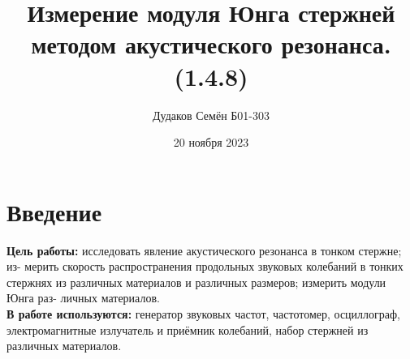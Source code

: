 \documentclass[a4, 12pt]{article}
\title{\textbf{Измерение модуля Юнга стержней методом акустического резонанса. (1.4.8)}}
\author{Дудаков Семён Б01-303}
\date{20 ноября 2023}
\begin{document}
	\maketitle

	\section{Введение}
    \textbf{Цель работы:} исследовать явление акустического резонанса в тонком стержне; из-
мерить скорость распространения продольных звуковых колебаний в тонких стержнях из различных материалов и различных размеров; измерить модули Юнга раз-
личных материалов.\\
\textbf{В работе используются:} генератор звуковых частот, частотомер, осциллограф,
электромагнитные излучатель и приёмник колебаний, набор стержней из различных материалов.
\end{document}
